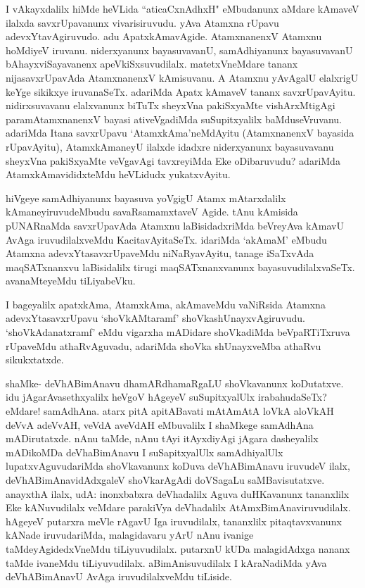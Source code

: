 
\begin{artha}
I vAkayxdalilx hiMde heVLida ``aticaCxnAdhxH" eMbudanunx aMdare kAmaveV ilalxda savxrUpavanunx vivarisiruvudu. yAva Atamxna rUpavu adevxYtavAgiruvudo. adu ApatxkAmavAgide. AtamxnanenxV Atamxnu hoMdiyeV iruvanu. niderxyanunx bayasuvavanU, samAdhiyanunx bayasuvavanU bAhayxviSayavanenx apeVkiSxsuvudilalx. matetxVneMdare tananx nijasavxrUpavAda AtamxnanenxV kAmisuvanu. A Atamxnu yAvAgalU elalxrigU keYge sikikxye iruvanaSeTx. adariMda Apatx kAmaveV tananx savxrUpavAyitu. nidirxsuvavanu elalxvanunx biTuTx sheyxVna pakiSxyaMte vishArxMtigAgi paramAtamxnanenxV bayasi ativeVgadiMda suSupitxyalilx baMduseVruvanu. adariMda Itana savxrUpavu `AtamxkAma'neMdAyitu (AtamxnanenxV bayasida rUpavAyitu), AtamxkAmaneyU ilalxde idadxre niderxyanunx bayasuvavanu sheyxVna pakiSxyaMte veVgavAgi tavxreyiMda Eke oDibaruvudu? adariMda AtamxkAmavididxteMdu heVLidudx yukatxvAyitu. 
\end{artha}%

\begin{artha}
hiVgeye samAdhiyanunx bayasuva yoVgigU Atamx mAtarxdalilx kAmaneyiruvudeMbudu savaRsamamxtaveV Agide. tAnu kAmisida pUNARnaMda savxrUpavAda Atamxnu laBisidadxriMda beVreyAva kAmavU AvAga iruvudilalxveMdu KacitavAyitaSeTx. idariMda `akAmaM' eMbudu Atamxna adevxYtasavxrUpaveMdu niNaRyavAyitu, tanage iSaTxvAda maqSATxnanxvu laBisidalilx tirugi maqSATxnanxvanunx bayasuvudilalxvaSeTx. avanaMteyeMdu tiLiyabeVku.
\end{artha}

\begin{artha}
I bageyalilx apatxkAma, AtamxkAma, akAmaveMdu vaNiRsida Atamxna adevxYtasavxrUpavu `shoVkAMtaramf' shoVkashUnayxvAgiruvudu. `shoVkAdanatxramf' eMdu vigarxha mADidare shoVkadiMda beVpaRTiTxruva rUpaveMdu athaRvAguvadu, adariMda shoVka shUnayxveMba athaRvu sikukxtatxde. 
\end{artha}

\begin{artha}
shaMke- deVhABimAnavu dhamARdhamaRgaLU shoVkavanunx koDutatxve. idu jAgarAvasethxyalilx heVgoV hAgeyeV suSupitxyalUlx irabahudaSeTx? eMdare! samAdhAna. atarx pitA apitABavati mAtA\s mAtA loVkA aloVkAH deVvA adeVvAH, veVdA aveVdAH eMbuvalilx I shaMkege samAdhAna mADirutatxde. nAnu taMde, nAnu tAyi itAyxdiyAgi jAgara dasheyalilx mADikoMDa deVhaBimAnavu I suSapitxyalUlx samAdhiyalUlx lupatxvAguvudariMda shoVkavanunx koDuva deVhABimAnavu iruvudeV ilalx, deVhABimAnavidAdxgaleV shoVkarAgAdi doVSagaLu saMBavisutatxve. anayxthA ilalx, udA: inonxbabxra deVhadalilx Aguva duHKavanunx tananxlilx Eke kANuvudilalx veMdare parakiVya deVhadalilx AtAmxBimAnaviruvudilalx. hAgeyeV putarxra meVle rAgavU Iga iruvudilalx, tananxlilx pitaqtavxvanunx kANade iruvudariMda, malagidavaru yArU nAnu ivanige taMdeyAgidedxVneMdu tiLiyuvudilalx. putarxnU kUDa malagidAdxga nananx taMde ivaneMdu tiLiyuvudilalx. aBimAnisuvudilalx I kAraNadiMda yAva deVhABimAnavU AvAga iruvudilalxveMdu tiLiside.
\end{artha}%

